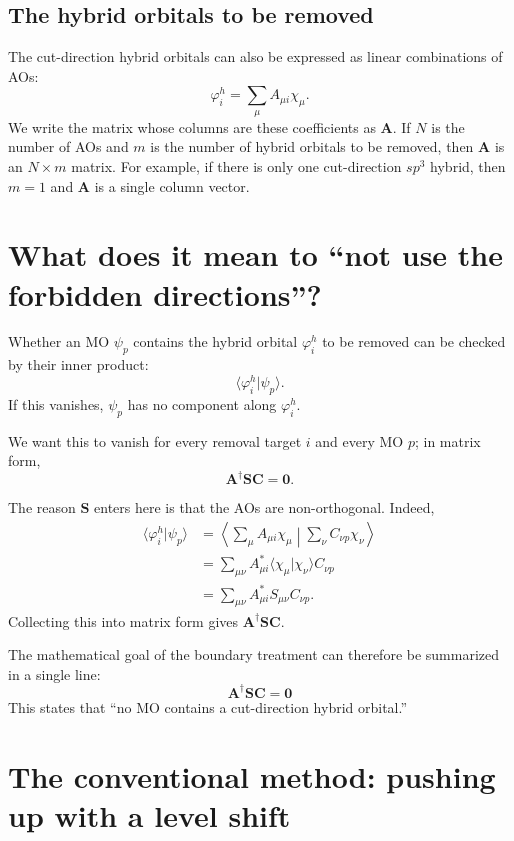 \documentclass[11pt]{article}
\newcommand{\Smat}{\mathbf S}
\newcommand{\Amat}{\mathbf A}
\newcommand{\Cmat}{\mathbf C}
\begin{document}
\subsection{The hybrid orbitals to be removed}

The cut-direction hybrid orbitals can also be expressed as linear
combinations of AOs:
\[
  \varphi_i^h = \sum_\mu A_{\mu i}\chi_\mu .
\]
We write the matrix whose columns are these coefficients as \(\Amat\).
If \(N\) is the number of AOs and \(m\) is the number of hybrid
orbitals to be removed, then \(\Amat\) is an \(N\times m\) matrix. For
example, if there is only one cut-direction \(sp^3\) hybrid, then
\(m=1\) and \(\Amat\) is a single column vector.

\section{What does it mean to ``not use the forbidden directions''?}

Whether an MO \(\psi_p\) contains the hybrid orbital \(\varphi_i^h\) to
be removed can be checked by their inner product:
\[
  \langle \varphi_i^h | \psi_p \rangle .
\]
If this vanishes, \(\psi_p\) has no component along \(\varphi_i^h\).

We want this to vanish for every removal target \(i\) and every MO
\(p\); in matrix form,
\[
  \Amat^\dagger \Smat \Cmat = \mathbf 0 .
\]

The reason \(\Smat\) enters here is that the AOs are non-orthogonal.
Indeed,
\begin{align*}
\langle \varphi_i^h | \psi_p \rangle
&=
\left\langle
\sum_\mu A_{\mu i}\chi_\mu
\middle|
\sum_\nu C_{\nu p}\chi_\nu
\right\rangle \\
&=
\sum_{\mu\nu} A_{\mu i}^{*}
\langle \chi_\mu | \chi_\nu \rangle
C_{\nu p} \\
&=
\sum_{\mu\nu} A_{\mu i}^{*} S_{\mu\nu} C_{\nu p}.
\end{align*}
Collecting this into matrix form gives \(\Amat^\dagger\Smat\Cmat\).

The mathematical goal of the boundary treatment can therefore be
summarized in a single line:
\[
  \boxed{\Amat^\dagger \Smat \Cmat = \mathbf 0}
\]
This states that ``no MO contains a cut-direction hybrid orbital.''

\section{The conventional method: pushing up with a level shift}
\end{document}
